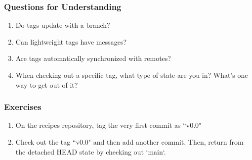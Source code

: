 \subsubsection{Questions for Understanding}
\begin{enumerate}
	\item Do tags update with a branch?
	\item Can lightweight tags have messages?
	\item Are tags automatically synchronized with remotes?
	\item When checking out a specific tag, what type of state are you in?
	   What's one way to get out of it?
\end{enumerate}

\subsubsection{Exercises}
\begin{enumerate}
	\item On the recipes repository, tag the very first commit as ``v0.0"
	\item Check out the tag ``v0.0" and then add another commit.
	   Then, return from the detached HEAD state by checking out `main`.
\end{enumerate}
